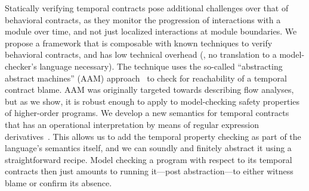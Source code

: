 Statically verifying temporal contracts pose additional challenges
over that of behavioral contracts, as they monitor the progression of
interactions with a module over time, and not just localized
interactions at module boundaries.
%
We propose a framework that is composable with known techniques to
verify behavioral contracts, and has low technical overhead (\eg, no
translation to a model-checker's language necessary).
%
The technique uses the so-called ``abstracting abstract machines''
(AAM) approach~\citep{dvanhorn:VanHorn2010Abstracting} to check for
reachability of a temporal contract blame.
AAM was originally targeted towards describing flow analyses, but as
we show, it is robust enough to apply to model-checking safety
properties of higher-order programs.
%
We develop a new semantics for temporal contracts that has an operational interpretation by means of regular expression derivatives~\citep{ianjohnson:Brzozowski1964}.
%
This allows us to add the temporal property checking as part of the
language's semantics itself, and we can soundly and finitely abstract
it using a straightforward recipe.
%
Model checking a program with respect to its temporal contracts then
just amounts to running it---post abstraction---to either witness
blame or confirm its absence.


